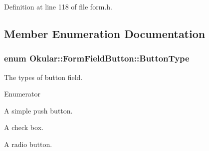 Definition at line 118 of file form.\+h.



\subsection{Member Enumeration Documentation}
\hypertarget{classOkular_1_1FormFieldButton_a4b03fd77132be17273c8f4ebbd247186}{
\subsubsection[{Button\+Type}]{\setlength{\rightskip}{0pt plus 5cm}enum {\bf Okular\+::\+Form\+Field\+Button\+::\+Button\+Type}}}\label{classOkular_1_1FormFieldButton_a4b03fd77132be17273c8f4ebbd247186}
The types of button field. \begin{Desc}
\item[Enumerator]\par
\begin{description}
\item[{\em 
\hypertarget{classOkular_1_1FormFieldButton_a4b03fd77132be17273c8f4ebbd247186a695472284a9cac26351b37a9a9b5b839}{Push}\label{classOkular_1_1FormFieldButton_a4b03fd77132be17273c8f4ebbd247186a695472284a9cac26351b37a9a9b5b839}
}]A simple push button. \item[{\em 
\hypertarget{classOkular_1_1FormFieldButton_a4b03fd77132be17273c8f4ebbd247186aa5cf5e1b5256d0772bdd6e87e4989b95}{Check\+Box}\label{classOkular_1_1FormFieldButton_a4b03fd77132be17273c8f4ebbd247186aa5cf5e1b5256d0772bdd6e87e4989b95}
}]A check box. \item[{\em 
\hypertarget{classOkular_1_1FormFieldButton_a4b03fd77132be17273c8f4ebbd247186aecc91a17eb86524d6f40713cd0407d4e}{Radio}\label{classOkular_1_1FormFieldButton_a4b03fd77132be17273c8f4ebbd247186aecc91a17eb86524d6f40713cd0407d4e}
}]A radio button. \end{description}
\end{Desc}



